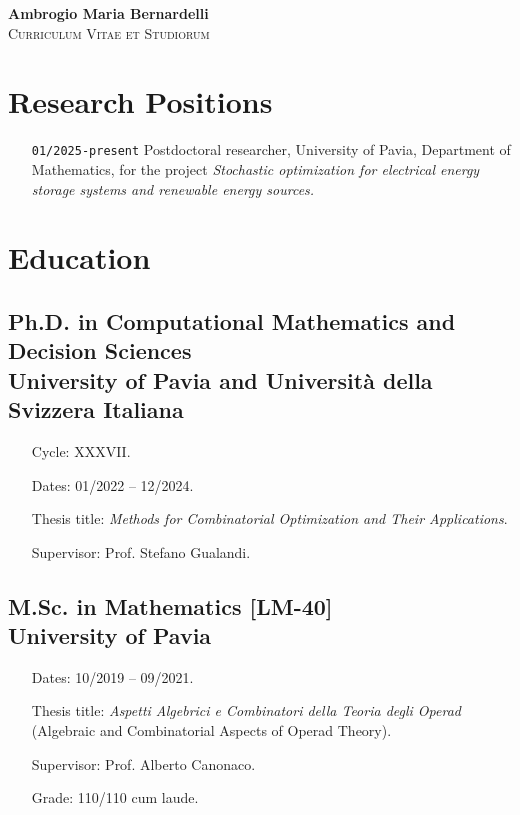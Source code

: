 \documentclass[11pt,a4paper]{article}
\begin{document}
\begin{center}
    {\LARGE \textbf{Ambrogio Maria Bernardelli}}\\
    \vspace{0.2cm}
     \textsc{Curriculum Vitae et Studiorum}
\end{center}

\vspace{0.5cm}

\section*{Research Positions}
\begin{itemize}[noitemsep, labelwidth=*,align=left, labelwidth=!]
    \item[\texttt{01/2025-present}] Postdoctoral researcher, University of Pavia, Department of Mathematics, for the project \emph{Stochastic optimization for electrical energy storage systems and renewable energy sources.}
\end{itemize}

\section*{Education}
\subsection*{Ph.D. in Computational Mathematics and Decision Sciences \\ \small University of Pavia and Università della Svizzera Italiana} 
\begin{itemize}[noitemsep, labelwidth=*,align=left, labelwidth=!]
    \item[Cycle:] XXXVII.
    \item[Dates:] 01/2022 -- 12/2024.
    \item[Thesis title:] \emph{Methods for Combinatorial Optimization and Their Applications}.
    \item[Supervisor:] Prof. Stefano Gualandi.
\end{itemize}
\subsection*{M.Sc. in Mathematics [LM-40] \\ \small University of Pavia}
\begin{itemize}[noitemsep, labelwidth=*,align=left, labelwidth=!]
    \item[Dates:]  10/2019 -- 09/2021.
    \item[Thesis title:] \emph{Aspetti Algebrici e Combinatori della Teoria degli Operad} (Algebraic and Combinatorial Aspects of Operad Theory).
    \item[Supervisor:] Prof. Alberto Canonaco.   
    \item[Grade:] 110/110 cum laude.
\end{itemize}
\end{document}
